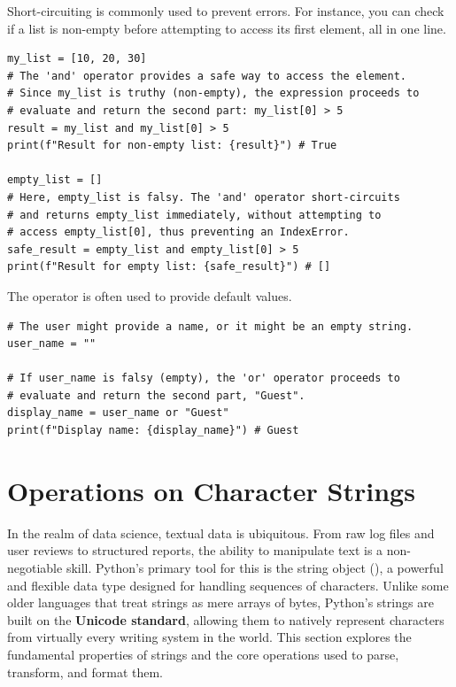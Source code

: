 \begin{example}
Short-circuiting is commonly used to prevent errors. For instance, you can check if a list is non-empty before attempting to access its first element, all in one line.
\text{ }\begin{verbatim}
my_list = [10, 20, 30]
# The 'and' operator provides a safe way to access the element.
# Since my_list is truthy (non-empty), the expression proceeds to
# evaluate and return the second part: my_list[0] > 5
result = my_list and my_list[0] > 5
print(f"Result for non-empty list: {result}") # True

empty_list = []
# Here, empty_list is falsy. The 'and' operator short-circuits
# and returns empty_list immediately, without attempting to
# access empty_list[0], thus preventing an IndexError.
safe_result = empty_list and empty_list[0] > 5
print(f"Result for empty list: {safe_result}") # []
\end{verbatim}

The  operator is often used to provide default values.
\text{ }\begin{verbatim}
# The user might provide a name, or it might be an empty string.
user_name = ""

# If user_name is falsy (empty), the 'or' operator proceeds to
# evaluate and return the second part, "Guest".
display_name = user_name or "Guest"
print(f"Display name: {display_name}") # Guest
\end{verbatim}
\end{example}

\section{Operations on Character Strings}
\label{sec:string_operations}
In the realm of data science, textual data is ubiquitous. From raw log files and user reviews to structured reports, the ability to manipulate text is a non-negotiable skill. Python's primary tool for this is the string object (), a powerful and flexible data type designed for handling sequences of characters. Unlike some older languages that treat strings as mere arrays of bytes, Python's strings are built on the \textbf{Unicode standard}, allowing them to natively represent characters from virtually every writing system in the world. This section explores the fundamental properties of strings and the core operations used to parse, transform, and format them.

